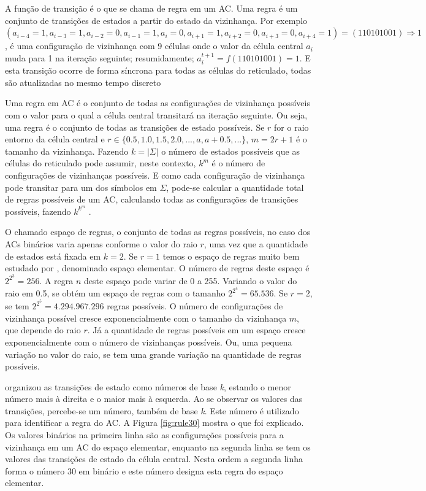 \documentclass[12pt,a4paper]{report}
\begin{document}
	A função de transição é o que se chama de regra em um AC. Uma regra é um conjunto de transições de estados a partir do estado da vizinhança. Por exemplo $(a_{i-4}=1,a_{i-3}=1,a_{i-2}=0,a_{i-1}=1,a_{i}=0,a_{i+1}=1,a_{i+2}=0,a_{i+3}=0,a_{i+4}=1) = (110101001)\Rightarrow 1$, é uma configuração de vizinhança com 9 células onde o valor da célula central $a_i$ muda para 1 na iteração seguinte; resumidamente; $a^{t+1}_i=f(110101001)=1$. E esta transição ocorre de forma síncrona para todas as células do reticulado, todas são atualizadas no mesmo tempo discreto \cite{2002:NKS:513738}
	
	Uma regra em AC é o conjunto de todas as configurações de vizinhança possíveis com o valor para o qual a célula central transitará na iteração seguinte. Ou seja, uma regra é o conjunto de todas as transições de estado possíveis. Se $r$ for o raio entorno da célula central e $r \in \{0.5, 1.0, 1.5, 2.0, ..., a, a + 0.5, ...\}$, $m = 2r + 1$ é o tamanho da vizinhança. Fazendo $k = |\Sigma|$ o número de estados possíveis que as células do reticulado pode assumir, neste contexto, $k^m$ é o número de configurações de vizinhanças possíveis. E como cada configuração de vizinhança pode transitar para um dos símbolos em $\Sigma$, pode-se calcular a quantidade total de regras possíveis de um AC, calculando todas as configurações de transições possíveis, fazendo $k^{k^m}$ \cite{Martinez_2013}.
	
	O chamado espaço de regras, o conjunto de todas as regras possíveis, no caso dos ACs binários varia apenas conforme o valor do raio $r$, uma vez que a quantidade de estados está fixada em $k = 2$. Se $r = 1$ temos o espaço de regras muito bem estudado por , denominado espaço elementar. O número de regras deste espaço é $2^{2^3} = 256$. A regra $n$ deste espaço pode variar de 0 a 255. Variando o valor do raio em 0.5, se obtém um espaço de regras com o tamanho $2^{2^4} = 65.536$. Se $r=2$, se tem $2^{2^5} = 4.294.967.296$ regras possíveis. O número de configurações de vizinhança possível cresce exponencialmente com o tamanho da vizinhança $m$, que depende do raio $r$. Já a quantidade de regras possíveis em um espaço cresce exponencialmente com o número de vizinhanças possíveis. Ou, uma pequena variação no valor do raio, se tem uma grande variação na quantidade de regras possíveis.
	
	 organizou as transições de estado como números de base \textit{k}, estando o menor número mais à direita e o maior mais à esquerda. Ao se observar os valores das transições, percebe-se um número, também de base \textit{k}. Este número é utilizado para identificar a regra do AC. A Figura \ref{fig:rule30} mostra o que foi explicado. Os valores binários na primeira linha são as configurações possíveis para a vizinhança em um AC do espaço elementar, enquanto na segunda linha se tem os valores das transições de estado da célula central. Nesta ordem a segunda linha forma o número 30 em binário e este número designa esta regra do espaço elementar.
	
\end{document}
